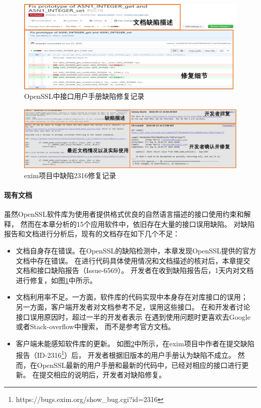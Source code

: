 \begin{figure}[b]
	\centering
	\includegraphics[width=\linewidth]{figures/cp4-doc-bug.png}
	\caption{
		OpenSSL中接口用户手册缺陷修复记录
	}
	\label{fig:4-4-doc-bug}
\end{figure}
\begin{figure}[t]
	\centering
	\includegraphics[width=\linewidth]{figures/cp4-exim-bug.png}
	\caption{
		exim项目中缺陷2316修复记录
	}
	\label{fig:4-4-exim-bug}
\end{figure}
\paragraph{现有文档}
虽然OpenSSL软件库为使用者提供格式优良的自然语言描述的接口使用约束和解释，
然而在本章分析的15个应用软件中，依旧存在大量的接口误用缺陷。
对缺陷报告和文档进行分析后，现有的文档存在如下几个不足：
\begin{itemize}
	\item 文档自身存在错误。在OpenSSL的缺陷检测中，本章发现OpenSSL提供的官方文档中存在错误。
	在进行代码具体使用情况和文档描述的核对后，本章提交文档和接口缺陷报告（Issue-6569）。
	开发者在收到缺陷报告后，1天内对文档进行修复，如图\ref{fig:4-4-doc-bug}中所示。
	\item 文档利用率不足。一方面，软件库的代码实现中本身存在对库接口的误用；
	另一方面，客户端开发者对文档参考不足，误用这些接口。
	在和开发者讨论接口误用原因时，超过一半的开发者表示
	在遇到使用问题时更喜欢去Google或者Stack-overflow中搜索，
	而不是参考官方文档。
	\item 客户端未能感知软件库的更新。
	如图\ref{fig:4-4-exim-bug}中所示，在exim项目中作者在提交缺陷报告（ID-2316\footnote{https://bugs.exim.org/show\_bug.cgi?id=2316}）后，
	开发者根据旧版本的用户手册认为缺陷不成立。
	然而，在OpenSSL最新的用户手册和最新的代码中，已经对相应的接口进行更新。
	在提交相应的说明后，开发者对缺陷修复。
\end{itemize}

